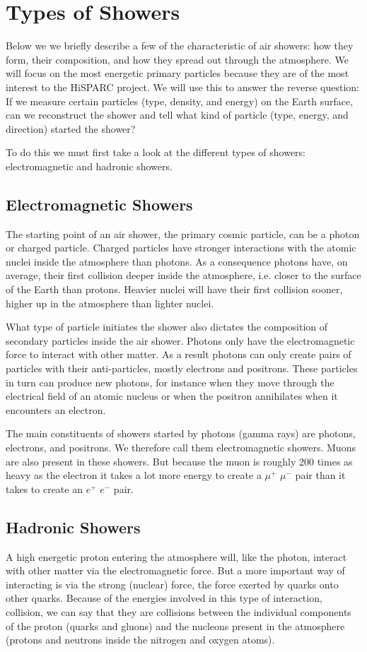 \section{Types of Showers}
Below we we briefly describe a few of the characteristic of air showers: how they form, their composition, and how they spread out through the atmosphere. We will focus on the most energetic primary particles because they are of the most interest to the HiSPARC project. We will use this to answer the reverse question: If we measure certain particles (type, density, and energy) on the Earth surface, can we reconstruct the shower and tell what kind of particle (type, energy, and direction) started the shower?

To do this we must first take a look at the different types of showers: electromagnetic and hadronic showers.

\subsection{Electromagnetic Showers}
The starting point of an air shower, the primary cosmic particle, can be a photon or charged particle. Charged particles have stronger interactions with the atomic nuclei inside the atmosphere than photons. As a consequence photons have, on average, their first collision deeper inside the atmosphere, i.e. closer to the surface of the Earth than protons. Heavier nuclei will have their first collision sooner, higher up in the atmosphere than lighter nuclei.

What type of particle initiates the shower also dictates the composition of secondary particles inside the air shower. Photons only have the electromagnetic force to interact with other matter. As a result photons can only create pairs of particles with their anti-particles, mostly electrons and positrons. These particles in turn can produce new photons, for instance when they move through the electrical field of an atomic nucleus or when the positron annihilates when it encounters an electron.

The main constituents of showers started by photons (gamma rays) are photons, electrons, and positrons. We therefore call them electromagnetic showers. Muons are also present in these showers. But because the muon is roughly 200 times as heavy as the electron it takes a lot more energy to create a $\mu^+$ $\mu^-$ pair than it takes to create an $e^+$ $e^-$ pair.

\subsection{Hadronic Showers}
A high energetic proton entering the atmosphere will, like the photon, interact with other matter via the electromagnetic force. But a more important way of interacting is via the strong (nuclear) force, the force exerted by quarks onto other quarks. Because of the energies involved in this type of interaction, collision, we can say that they are collisions between the individual components of the proton (quarks and gluons) and the nucleons present in the atmosphere (protons and neutrons inside the nitrogen and oxygen atoms).

